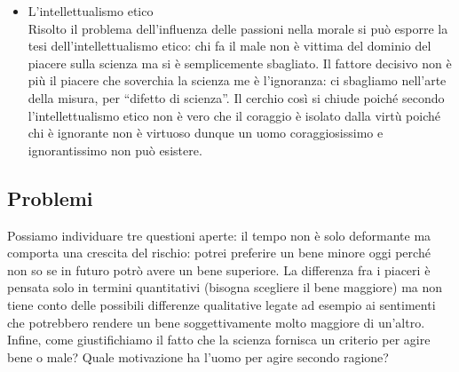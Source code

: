 \documentclass[10pt,a4paper]{article}
\begin{document}
\begin{itemize}
	\item L'intellettualismo etico\\
	Risolto il problema dell'influenza delle passioni nella morale si può esporre la tesi dell'intellettualismo etico: chi fa il male non è vittima del dominio del piacere sulla scienza ma si è semplicemente sbagliato. Il fattore decisivo non è più il piacere che soverchia la scienza me è l’ignoranza: ci sbagliamo nell’arte della misura, per “difetto di scienza”. Il cerchio così si chiude poiché secondo l'intellettualismo etico non è vero che il coraggio è isolato dalla virtù poiché chi è ignorante non è virtuoso dunque un uomo coraggiosissimo e ignorantissimo non può esistere. 
	
\end{itemize}
\subsection{Problemi}
Possiamo individuare tre questioni aperte: il tempo non è solo deformante ma comporta una crescita del rischio: potrei preferire un bene minore oggi perché non so se in futuro potrò avere un bene superiore. La differenza fra i piaceri è pensata solo in termini quantitativi (bisogna scegliere il bene maggiore) ma non tiene conto delle possibili differenze qualitative legate ad esempio ai sentimenti che potrebbero rendere un bene soggettivamente molto maggiore di un'altro. Infine, come giustifichiamo il fatto che la scienza fornisca un criterio per agire bene o male? Quale motivazione ha l'uomo per agire secondo ragione?
\end{document}
